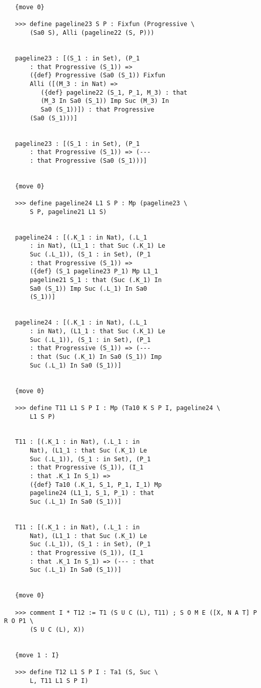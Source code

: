 \documentclass{article}
\begin{document}
\begin{verbatim}
   {move 0}

   >>> define pageline23 S P : Fixfun (Progressive \
       (Sa0 S), Alli (pageline22 (S, P)))


   pageline23 : [(S_1 : in Set), (P_1 
       : that Progressive (S_1)) => 
       ({def} Progressive (Sa0 (S_1)) Fixfun 
       Alli ([(M_3 : in Nat) => 
          ({def} pageline22 (S_1, P_1, M_3) : that 
          (M_3 In Sa0 (S_1)) Imp Suc (M_3) In 
          Sa0 (S_1))]) : that Progressive 
       (Sa0 (S_1)))]


   pageline23 : [(S_1 : in Set), (P_1 
       : that Progressive (S_1)) => (--- 
       : that Progressive (Sa0 (S_1)))]


   {move 0}

   >>> define pageline24 L1 S P : Mp (pageline23 \
       S P, pageline21 L1 S)


   pageline24 : [(.K_1 : in Nat), (.L_1 
       : in Nat), (L1_1 : that Suc (.K_1) Le 
       Suc (.L_1)), (S_1 : in Set), (P_1 
       : that Progressive (S_1)) => 
       ({def} (S_1 pageline23 P_1) Mp L1_1 
       pageline21 S_1 : that (Suc (.K_1) In 
       Sa0 (S_1)) Imp Suc (.L_1) In Sa0 
       (S_1))]


   pageline24 : [(.K_1 : in Nat), (.L_1 
       : in Nat), (L1_1 : that Suc (.K_1) Le 
       Suc (.L_1)), (S_1 : in Set), (P_1 
       : that Progressive (S_1)) => (--- 
       : that (Suc (.K_1) In Sa0 (S_1)) Imp 
       Suc (.L_1) In Sa0 (S_1))]


   {move 0}

   >>> define T11 L1 S P I : Mp (Ta10 K S P I, pageline24 \
       L1 S P)


   T11 : [(.K_1 : in Nat), (.L_1 : in 
       Nat), (L1_1 : that Suc (.K_1) Le 
       Suc (.L_1)), (S_1 : in Set), (P_1 
       : that Progressive (S_1)), (I_1 
       : that .K_1 In S_1) => 
       ({def} Ta10 (.K_1, S_1, P_1, I_1) Mp 
       pageline24 (L1_1, S_1, P_1) : that 
       Suc (.L_1) In Sa0 (S_1))]


   T11 : [(.K_1 : in Nat), (.L_1 : in 
       Nat), (L1_1 : that Suc (.K_1) Le 
       Suc (.L_1)), (S_1 : in Set), (P_1 
       : that Progressive (S_1)), (I_1 
       : that .K_1 In S_1) => (--- : that 
       Suc (.L_1) In Sa0 (S_1))]


   {move 0}

   >>> comment I * T12 := T1 (S U C (L), T11) ; S O M E ([X, N A T] P R O P1 \
       (S U C (L), X))


   {move 1 : I}

   >>> define T12 L1 S P I : Ta1 (S, Suc \
       L, T11 L1 S P I)



\end{verbatim}
\end{document}
